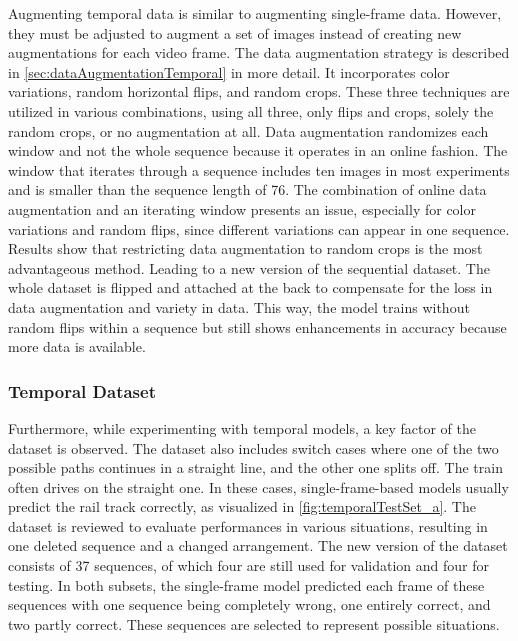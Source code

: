 Augmenting temporal data is similar to augmenting single-frame data.
However, they must be adjusted to augment a set of images instead of creating new augmentations for each video frame.
The data augmentation strategy is described in \autoref{sec:dataAugmentationTemporal} in more detail.
It incorporates color variations, random horizontal flips, and random crops.
These three techniques are utilized in various combinations, using all three, only flips and crops, solely the random crops, or no augmentation at all.
Data augmentation randomizes each window and not the whole sequence because it operates in an online fashion.
The window that iterates through a sequence includes ten images in most experiments and is smaller than the sequence length of 76.
The combination of online data augmentation and an iterating window presents an issue, especially for color variations and random flips, since different variations can appear in one sequence.
Results show that restricting data augmentation to random crops is the most advantageous method.
Leading to a new version of the sequential dataset.
The whole dataset is flipped and attached at the back to compensate for the loss in data augmentation and variety in data.
This way, the model trains without random flips within a sequence but still shows enhancements in accuracy because more data is available.

\subsubsection{Temporal Dataset}

Furthermore, while experimenting with temporal models, a key factor of the dataset is observed.
The dataset also includes switch cases where one of the two possible paths continues in a straight line, and the other one splits off.
The train often drives on the straight one.
In these cases, single-frame-based models usually predict the rail track correctly, as visualized in \autoref{fig:temporalTestSet_a}.
The dataset is reviewed to evaluate performances in various situations, resulting in one deleted sequence and a changed arrangement.
The new version of the dataset consists of 37 sequences, of which four are still used for validation and four for testing.
In both subsets, the single-frame model predicted each frame of these sequences with one sequence being completely wrong, one entirely correct, and two partly correct.
These sequences are selected to represent possible situations.


